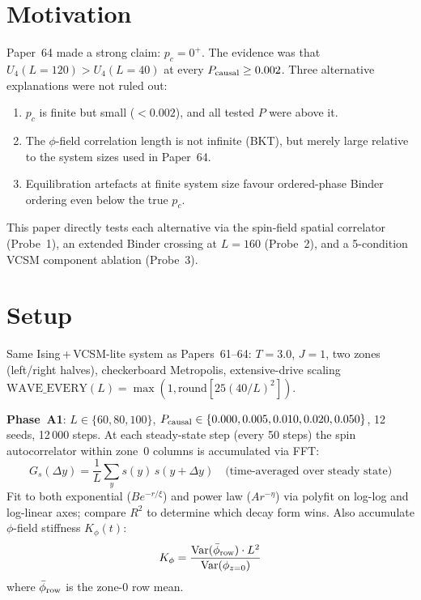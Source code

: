 \documentclass[12pt,a4paper]{article}
\begin{document}
\section{Motivation}

Paper~64 made a strong claim: $p_c = 0^+$.
The evidence was that $U_4(L=120) > U_4(L=40)$ at every $P_{\rm causal} \geq 0.002$.
Three alternative explanations were not ruled out:
\begin{enumerate}
  \item $p_c$ is finite but small ($< 0.002$), and all tested $P$ were above it.
  \item The $\phi$-field correlation length is not infinite (BKT),
    but merely large relative to the system sizes used in Paper~64.
  \item Equilibration artefacts at finite system size favour ordered-phase
    Binder ordering even below the true $p_c$.
\end{enumerate}
This paper directly tests each alternative via
the spin-field spatial correlator (Probe~1),
an extended Binder crossing at $L=160$ (Probe~2),
and a 5-condition VCSM component ablation (Probe~3).

\section{Setup}

Same Ising\,+\,VCSM-lite system as Papers~61--64:
$T = 3.0$, $J = 1$, two zones (left/right halves),
checkerboard Metropolis, extensive-drive scaling
$\text{WAVE\_EVERY}(L) = \max(1, \text{round}[25 (40/L)^2])$.

\textbf{Phase~A1}: $L \in \{60, 80, 100\}$,
$P_{\rm causal} \in \{0.000, 0.005, 0.010, 0.020, 0.050\}$,
12 seeds, 12\,000 steps.
At each steady-state step (every 50 steps) the spin autocorrelator
within zone~0 columns is accumulated via FFT:
\begin{equation}
G_s(\Delta y) = \frac{1}{L}\sum_y s(y)\,s(y+\Delta y)
\quad\text{(time-averaged over steady state)}
\end{equation}
Fit to both exponential ($B e^{-r/\xi}$) and power law ($A r^{-\eta}$)
via polyfit on log-log and log-linear axes;
compare $R^2$ to determine which decay form wins.
Also accumulate $\phi$-field stiffness $K_\phi(t)$:
\begin{equation}
K_\phi = \frac{\mathrm{Var}(\bar\phi_{\rm row})\cdot L^2}{\mathrm{Var}(\phi_{z=0})}
\end{equation}
where $\bar\phi_{\rm row}$ is the zone-0 row mean.
\end{document}
